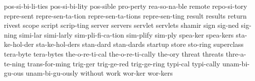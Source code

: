 {    pos-si-bi-li-ties
    pos-si-bi-lity
    pos-sible
    pro-perty
    rea-so-na-ble
    remote
    repo-si-tory
    repre-sent
    repre-sen-ta-tion
    repre-sen-ta-tions
    repre-sen-ting
    result
    results
    return
    rivest
    scope
    script
    scrip-ting
    server
    servers
    servlet
    servlets
    shamir
    sign
    sig-ned
    sig-ning
    simi-lar
    simi-larly
    sim-pli-fi-ca-tion
    sim-plify
    sim-ply
    spea-ker
    spea-kers
    sta-ke-hol-der
    sta-ke-hol-ders
    stan-dard
    stan-dards
    startup
    store
    sto-ring
    superclass
    tera-byte
    tera-bytes
    the-o-re-ti-cal
    the-o-re-ti-cally
    the-ory
    threat
    threats
    thre-a-te-ning
    trans-for-ming
    trig-ger
    trig-ge-red
    trig-ge-ring
    typi-cal
    typi-cally
    unam-bi-gu-ous
    unam-bi-gu-ously
    without
    work
    wor-ker
    wor-kers
}
